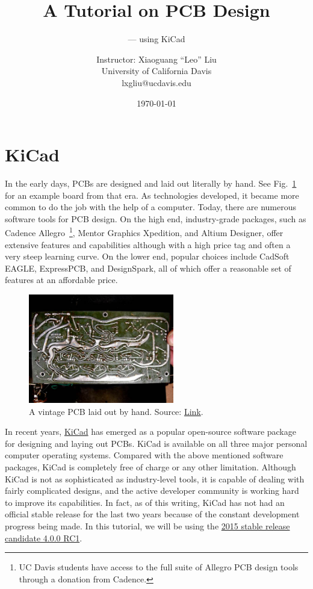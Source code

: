 \documentclass[12pt,letterpaper]{scrartcl}
\title{A Tutorial on PCB Design}
\subtitle{--- using KiCad}
\author{Instructor: Xiaoguang ``Leo'' Liu \\University of California Davis \\ lxgliu@ucdavis.edu}
\date{\today}
\begin{document}
\maketitle

\tableofcontents

\newpage

\section{KiCad}
In the early days, PCBs are designed and laid out literally by hand. See Fig.~\ref{fig:hand-pcb} for an example board from that era. As technologies developed, it became more common to do the job with the help of a computer. Today, there are numerous software tools for PCB design. On the high end, industry-grade packages, such as Cadence Allegro~\footnote{UC Davis students have access to the full suite of Allegro PCB design tools through a donation from Cadence.}, Mentor Graphics Xpedition, and Altium Designer, offer extensive features and capabilities although with a high price tag and often a very steep learning curve. On the lower end, popular choices include CadSoft EAGLE, ExpressPCB, and DesignSpark, all of which offer a reasonable set of features at an affordable price. 

\begin{figure}[ht]
\centering
\includegraphics[width=2.5in]{hand-pcb.jpg}
\caption{A vintage PCB laid out by hand. Source: \href{http://grantmuller.com/maestro-ps-1b-teardown/}{Link}.}
\label{fig:hand-pcb}
\end{figure}

In recent years, \href{http://www.kicad-pcb.org/}{KiCad} has emerged as a popular open-source software package for designing and laying out PCBs. KiCad is available on all three major personal computer operating systems. Compared with the above mentioned software packages, KiCad is completely free of charge or any other limitation. Although KiCad is not as sophisticated as industry-level tools, it is capable of dealing with fairly complicated designs, and the active developer community is working hard to improve its capabilities. In fact, as of this writing, KiCad has not had an official stable release for the last two years because of the constant development progress being made. In this tutorial, we will be using the \href{http://kicad-pcb.org/download/windows/}{2015 stable release candidate 4.0.0 RC1}.
\end{document}
